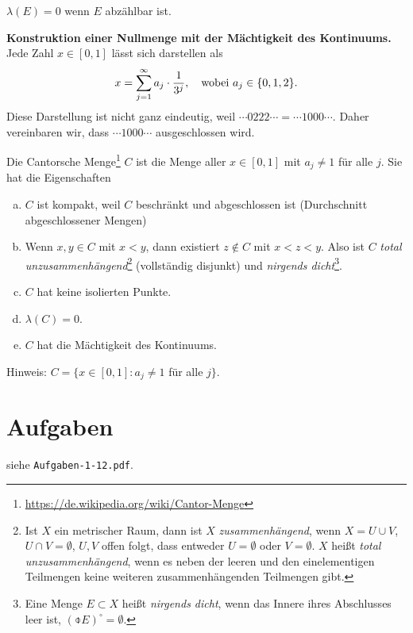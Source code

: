\begin{rmrk}
 \item $\lambda(E) = 0$ wenn $E$ abzählbar ist. 
 
 \textbf{Konstruktion einer Nullmenge mit der Mächtigkeit des Kontinuums.} Jede Zahl $x \in [0,1]$ lässt sich darstellen als
 \[ x = \sum_{j=1}^\infty a_j \cdot \frac{1}{3^j}, \quad \text{wobei } a_j \in \{ 0,1,2 \}. \]
 Diese Darstellung ist nicht ganz eindeutig, weil $\cdots 0 2 2 2 \cdots = \cdots 1 0 0 0 \cdots$. Daher vereinbaren wir, dass $\cdots 1 0 0 0 \cdots$ ausgeschlossen wird.
 
 Die Cantorsche Menge\footnote{\url{https://de.wikipedia.org/wiki/Cantor-Menge}} $C$ ist die Menge aller $x \in [0,1]$ mit $a_j \ne 1$ für alle $j$. Sie hat die Eigenschaften
 \begin{enumerate}[(a)]
  \item $C$ ist kompakt, weil $C$ beschränkt und abgeschlossen ist (Durchschnitt abgeschlossener Mengen)
  \item Wenn $x,y \in C$ mit $x < y$, dann existiert $z \notin C$ mit $x<z<y$. Also ist $C$ \emph{total unzusammenhängend}\footnote{Ist $X$ ein metrischer Raum, dann ist $X$ \emph{zusammenhängend}, wenn $X = U \cup V$, $U \cap V = \emptyset$, $U,V$ offen folgt, dass entweder $U = \emptyset$ oder $V = \emptyset$. $X$ heißt \emph{total unzusammenhängend}, wenn es neben der leeren und den einelementigen Teilmengen keine weiteren zusammenhängenden Teilmengen gibt.} (vollständig disjunkt) und \emph{nirgends dicht}\footnote{Eine Menge $E \subset X$ heißt \emph{nirgends dicht}, wenn das Innere ihres Abschlusses leer ist, $(\obar{E})^\circ = \emptyset$.}.
  \item $C$ hat keine isolierten Punkte.
  \item $\lambda(C) = 0$.
  \item $C$ hat die Mächtigkeit des Kontinuums.
 \end{enumerate}
 Hinweis: $C = \{ x \in [0,1] : a_j \ne 1$ für alle $j \}$. 
\end{rmrk}

\section{Aufgaben}
siehe \verb+Aufgaben-1-12.pdf+.